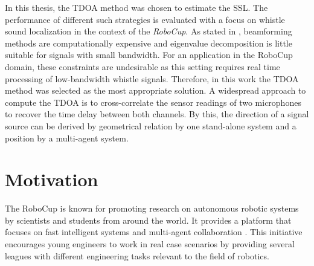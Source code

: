In this thesis, the \ac{TDOA} method was chosen to estimate the
\ac{SSL}. The performance of different such
strategies is evaluated with a focus on whistle sound localization in the
context of the \textit{\ac{RoboCup}}. 
As stated in \cite{BAS_estimator}, beamforming methods are computationally
expensive and eigenvalue decomposition is little suitable for signals with
small bandwidth. For an application in the \ac{RoboCup} domain, these constraints
are undesirable as this setting requires real time processing of low-bandwidth
whistle signals. Therefore, in this work the \ac{TDOA} method was selected as the
most appropriate solution.
A widespread approach to compute the \ac{TDOA} is to cross-correlate the sensor
readings of two microphones to recover the time delay between both channels. By
this, the direction of a signal source can be derived by geometrical relation
by one stand-alone system and a position by a multi-agent system.

\section{Motivation}

The \acf{RoboCup} is known for promoting research on autonomous robotic systems
by scientists and students from around the world.
It provides a platform that focuses on fast intelligent systems and multi-agent collaboration \cite{robocup}.
This initiative encourages young engineers to work in real case scenarios
by providing several leagues with different engineering tasks relevant to the field
of robotics.

